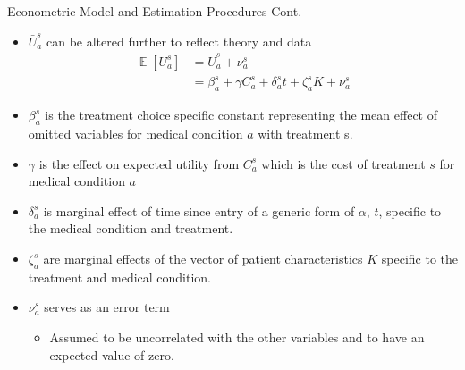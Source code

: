 \documentclass{beamer}
\DeclareMathOperator{\EX}{\mathbb{E}}
\begin{document}
\begin{frame}{Econometric Model and Estimation Procedures Cont.}
\begin{itemize}
\item $\bar{U}_a^s$ can be altered further to reflect theory and data
\begin{equation}
\begin{split}  \EX[U_a^s] & =\bar{U}_a^s + \nu_a^s\\
& = \beta_a^s + \gamma C_a^s + \delta_a^st + \zeta_a^sK + \nu_a^s
\end{split}
\end{equation}
\item $\beta_a^s$ is the treatment choice specific constant representing the mean effect of omitted variables for medical condition $a$ with treatment s.
\item $\gamma$ is the effect on expected utility from $C_a^s$ which is the cost of treatment $s$ for medical condition $a$
\item $\delta_a^s$ is marginal effect of time since entry of a generic form of $\alpha$, $t$, specific to the medical condition and treatment.
\item $\zeta_a^s$ are marginal effects of the vector of patient characteristics $K$ specific to the treatment and medical condition.
\item $\nu_a^s$ serves as an error term
\begin{itemize} 
  \item Assumed to be uncorrelated with the other variables and to have an expected value of zero.
\end{itemize}
\end{itemize}  
\end{frame}
\end{document}
